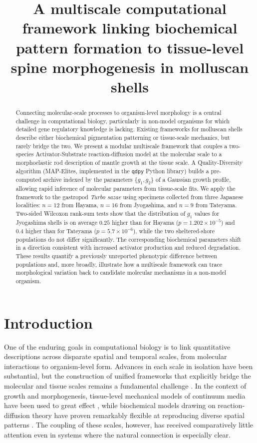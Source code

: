 \documentclass[11pt]{article}
\title{A multiscale computational framework linking biochemical pattern
formation to tissue-level spine morphogenesis in molluscan shells}
\author{}
\date{}
\begin{document}
\maketitle

\begin{abstract}
Connecting molecular-scale processes to organism-level morphology is a
central challenge in computational biology, particularly in non-model
organisms for which detailed gene regulatory knowledge is lacking. Existing
frameworks for molluscan shells describe either biochemical pigmentation
patterning or tissue-scale mechanics, but rarely bridge the two. We present
a modular multiscale framework that couples a two-species Activator-Substrate
reaction-diffusion model at the molecular scale to a morphoelastic rod
description of mantle growth at the tissue scale. A Quality-Diversity
algorithm (MAP-Elites, implemented in the \texttt{qdpy} Python library)
builds a pre-computed archive indexed by the parameters $\{g_1, g_2\}$ of a
Gaussian growth profile, allowing rapid inference of molecular parameters
from tissue-scale fits. We apply the framework to the gastropod
\textit{Turbo sazae} using specimens collected from three Japanese
localities: $n=12$ from Hayama, $n=16$ from Jyogashima, and $n=9$ from
Tateyama. Two-sided Wilcoxon rank-sum tests show that the distribution of
$g_1$ values for Jyogashima shells is on average $0.25$ higher than for
Hayama ($p = 1.202 \times 10^{-5}$) and $0.4$ higher than for Tateyama
($p = 5.7 \times 10^{-6}$), while the two sheltered-shore populations do not
differ significantly. The corresponding biochemical parameters shift in a
direction consistent with increased activator production and reduced
degradation. These results quantify a previously unreported phenotypic
difference between populations and, more broadly, illustrate how a
multiscale framework can trace morphological variation back to candidate
molecular mechanisms in a non-model organism.
\end{abstract}

\section{Introduction}

One of the enduring goals in computational biology is to link quantitative
descriptions across disparate spatial and temporal scales, from molecular
interactions to organism-level form. Advances in each scale in isolation
have been substantial, but the construction of unified frameworks that
explicitly bridge the molecular and tissue scales remains a fundamental
challenge \citep{goriely2017mathematics}. In the context of growth and
morphogenesis, tissue-level mechanical models of continuum media have been
used to great effect \citep{moulton2013morphoelastic,moulton2020morphoelastic},
while biochemical models drawing on reaction-diffusion theory have proven
remarkably flexible at reproducing diverse spatial patterns
\citep{turing1952chemical,gierer1972theory,meinhardt1987model,pueyo2018reactiondiffusion,murray2003mathematical,meinhardt2009algorithmic}.
The coupling of these scales, however, has received comparatively little
attention even in systems where the natural connection is especially clear.
\end{document}
